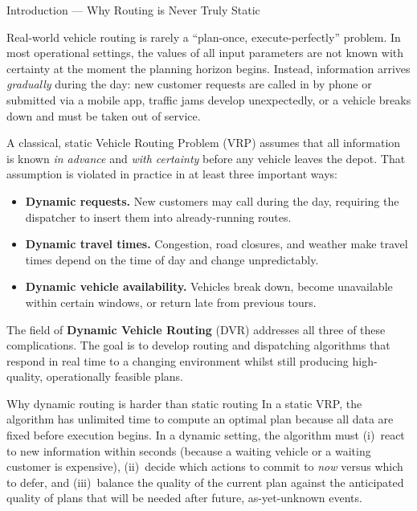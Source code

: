 \documentclass[aspectratio=169,10pt]{beamer}
\begin{document}
\begin{frame}[allowframebreaks]{Introduction — Why Routing is Never Truly Static}

  Real-world vehicle routing is rarely a ``plan-once, execute-perfectly'' problem.
  In most operational settings, the values of all input parameters are not known
  with certainty at the moment the planning horizon begins.
  Instead, information arrives \emph{gradually} during the day: new customer
  requests are called in by phone or submitted via a mobile app, traffic jams
  develop unexpectedly, or a vehicle breaks down and must be taken out of service.

  A classical, static Vehicle Routing Problem (VRP) assumes that all information
  is known \emph{in advance} and \emph{with certainty} before any vehicle leaves
  the depot.  That assumption is violated in practice in at least three important
  ways:
  \begin{itemize}
    \item \textbf{Dynamic requests.}  New customers may call during the day,
          requiring the dispatcher to insert them into already-running routes.
    \item \textbf{Dynamic travel times.}  Congestion, road closures, and weather
          make travel times depend on the time of day and change unpredictably.
    \item \textbf{Dynamic vehicle availability.}  Vehicles break down, become
          unavailable within certain windows, or return late from previous tours.
  \end{itemize}

  The field of \textbf{Dynamic Vehicle Routing} (DVR) addresses all three of these
  complications.  The goal is to develop routing and dispatching algorithms that
  respond in real time to a changing environment whilst still producing
  high-quality, operationally feasible plans.

  \framebreak

  \begin{block}{Why dynamic routing is harder than static routing}
    In a static VRP, the algorithm has unlimited time to compute an optimal plan
    because all data are fixed before execution begins.  In a dynamic setting,
    the algorithm must (i)~react to new information within seconds (because a
    waiting vehicle or a waiting customer is expensive), (ii)~decide which
    actions to commit to \emph{now} versus which to defer, and (iii)~balance
    the quality of the current plan against the anticipated quality of plans
    that will be needed after future, as-yet-unknown events.
  \end{block}


\end{frame}
\end{document}
